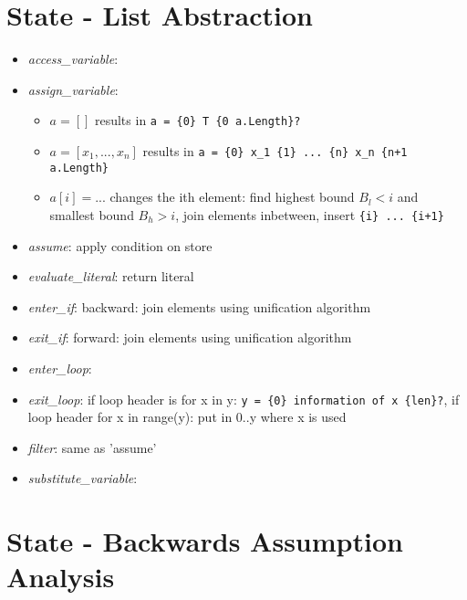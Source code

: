 \documentclass[11pt]{article}
\begin{document}
\section{State - List Abstraction}

\begin{itemize}
\item \textit{access\_variable}: 
\item \textit{assign\_variable}:
\begin{itemize}
\item $a = []$ results in \verb|a = {0} T {0 a.Length}?|
\item $a = [x_1,...,x_n]$ results in \verb|a = {0} x_1 {1} ... {n} x_n {n+1 a.Length}|
\item $a[i] = ...$ changes the ith element: find highest bound $B_l < i$ and smallest bound $B_h > i$, join elements inbetween, insert \verb|{i} ... {i+1}|
\end{itemize}
\item \textit{assume}: apply condition on store
\item \textit{evaluate\_literal}: return literal
\item \textit{enter\_if}: backward: join elements using unification algorithm
\item \textit{exit\_if}: forward: join elements using unification algorithm
\item \textit{enter\_loop}:
\item \textit{exit\_loop}: if loop header is for x in y: \verb|y = {0} information of x {len}?|, if loop header for x in range(y): put in 0..y where x is used
\item \textit{filter}: same as 'assume'
\item \textit{substitute\_variable}:
\end{itemize}

\section{State - Backwards Assumption Analysis}
\end{document}

